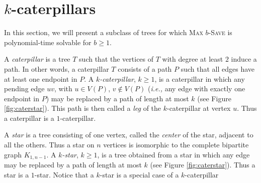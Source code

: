 \documentclass[10pt]{article}
\newcommand{\probtitle}[1]{\textsc{#1}}
\begin{document}
\section{$k$-caterpillars}\label{s:caterpillars}
 
In this section, we will present a subclass of trees for which \probtitle{Max $b$-Save} is polynomial-time solvable for $b \geq 1$.

A \textit{caterpillar} is a tree $T$ such that the vertices of $T$ with degree at least $2$ induce a path. In other words, a caterpillar $T$ consists of a path $P$ such that all edges have at least one endpoint in $P$. A \textit{$k$-caterpillar}, $k\geq 1$, is a caterpillar in which any pending edge $uv$, with $u\in V(P)$, $v\not \in V(P)$ (\textit{i.e.,} any edge with exactly one endpoint in $P$) may be replaced by a path of length at most $k$ (see Figure \ref{fig:caterstar}). This path is then called a \textit{leg} of the $k$-caterpillar at vertex $u$. Thus a caterpillar is a $1$-caterpillar.

A \textit{star} is a tree consisting of one vertex, called the \textit{center} of the star, adjacent to all the others. Thus a star on $n$ vertices is isomorphic to the complete bipartite graph $K_{1,n-1}$. A \textit{$k$-star}, $k\geq 1$, is a tree obtained from a star in which any edge may be replaced by a path of length at most $k$ (see Figure \ref{fig:caterstar}). Thus a star is a $1$-star.
Notice that a $k$-star is a special case of a $k$-caterpillar
\end{document}
